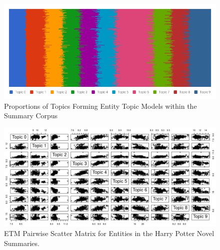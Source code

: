 \documentclass[10pt]{report}
\begin{document}
\renewcommand{\baselinestretch}{1.0}\normalsize
\renewcommand{\arraystretch}{1.0}
\begin{table}[h!]
  \centering
\caption{Average and Variance of Topic Proportions across Entity Topic Models in the Summary Corpus\label{tab:hp_summ_etm_var}}
\end{table}
\begin{figure}[h!]
  \centering
  \includegraphics[scale=0.5]{summ_etm_figure}
  \caption{Proportions of Topics Forming Entity Topic Models within the Summary Corpus\label{fig:hp_sum_etm_prop}}
\end{figure}
\renewcommand{\baselinestretch}{2.0}\normalsize
\renewcommand{\arraystretch}{1.0}

\clearpage
\begin{figure}[h!]
  \centering
  \includegraphics[scale=0.4]{hp_etms_summary}
  \caption{ETM Pairwise Scatter Matrix for Entities in the Harry Potter Novel Summaries.\label{fig:hp_summary_etm}}
\end{figure}
\end{document}
